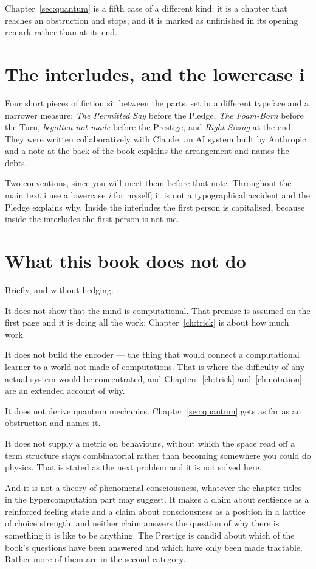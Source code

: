 \noindent
Chapter~\ref{sec:quantum} is a fifth case of a different kind: it
is a chapter that reaches an obstruction and stops, and it is
marked as unfinished in its opening remark rather than at its end.

\section*{The interludes, and the lowercase i}

Four short pieces of fiction sit between the parts, set in a
different typeface and a narrower measure: \emph{The Permitted Say}
before the Pledge, \emph{The Foam-Born} before the Turn,
\emph{begotten not made} before the Prestige, and
\emph{Right-Sizing} at the end.
They were written collaboratively with Claude, an AI system built
by Anthropic, and a note at the back of the book explains the
arrangement and names the debts.

Two conventions, since you will meet them before that note.
Throughout the main text i use a lowercase \emph{i} for myself; it
is not a typographical accident and the Pledge explains why.
Inside the interludes the first person is capitalised, because
inside the interludes the first person is not me.

\section*{What this book does not do}

Briefly, and without hedging.

It does not show that the mind is computational.
That premise is assumed on the first page and it is doing all the
work; Chapter~\ref{ch:trick} is about how much work.

It does not build the encoder --- the thing that would connect a
computational learner to a world not made of computations.
That is where the difficulty of any actual system would be
concentrated, and Chapters~\ref{ch:trick}
and~\ref{ch:notation} are an extended account of why.

It does not derive quantum mechanics.
Chapter~\ref{sec:quantum} gets as far as an obstruction and names
it.

It does not supply a metric on behaviours, without which the space
read off a term structure stays combinatorial rather than
becoming somewhere you could do physics.
That is stated as the next problem and it is not solved here.

And it is not a theory of phenomenal consciousness, whatever the
chapter titles in the hypercomputation part may suggest.
It makes a claim about sentience as a reinforced feeling state and
a claim about consciousness as a position in a lattice of choice
strength, and neither claim answers the question of why there is
something it is like to be anything.
The Prestige is candid about which of the book's questions have
been answered and which have only been made tractable.
Rather more of them are in the second category.

